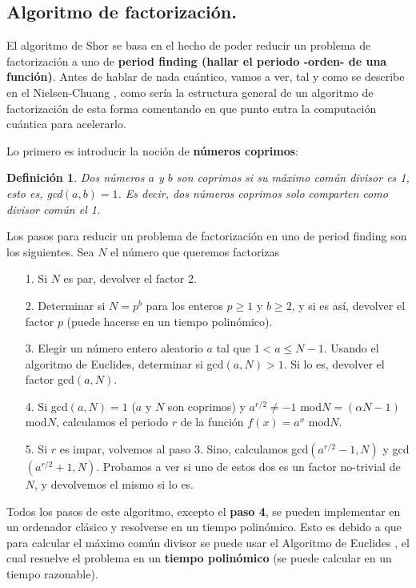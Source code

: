 \documentclass[a4paper,11pt]{book} %
\newtheorem{definicion_contador}{Definición}
\newcommand{\Definicion}[1]{
		\begin{mybox_gray2}{}
			\begin{definicion_contador}
				 #1 
			\end{definicion_contador} 
		\end{mybox_gray2}
	}
\numberwithin{equation}{chapter}
\begin{document}
\subsection{Algoritmo de factorización.} \label{sec_algoritmo_factorizacion}

El algoritmo de Shor se basa en el hecho de poder reducir un problema de factorización a uno de \textbf{period finding (hallar el periodo -orden- de una función)}. Antes de hablar de nada cuántico, vamos a ver, tal y como se describe en el Nielsen-Chuang \cite{bib_nielsen},  como sería la estructura general de un algoritmo de factorización de esta forma comentando en que punto entra la computación cuántica para acelerarlo.

Lo primero es introducir la noción de \textbf{números coprimos}:

	\Definicion{
	Dos números $a$ y $b$ son coprimos si su máximo común divisor es 1, esto es, gcd$(a,b) = 1$. Es decir, dos números coprimos solo comparten como divisor común el 1.
	}

Los pasos para reducir un problema de factorización en uno de period finding son los siguientes. Sea $N$ el número que queremos factorizas

\begin{itemize}
	\item[1.] Si $N$ es par, devolver el factor 2.

	\item[2.] Determinar si $N=p^b$ para los enteros $p \geq 1$ y $b \geq 2$, y si es así, devolver el factor $p$ (puede hacerse en un tiempo polinómico).

	\item[3.] Elegir un número entero aleatorio $a$ tal que $1 < a \leq N-1$. Usando el algoritmo de Euclides, determinar si gcd$(a,N) > 1$. Si lo es, devolver el factor gcd$(a,N)$.

	\item[4.] Si gcd$(a,N) = 1$ ($a$ y $N$ son coprimos) y $a^{r/2} \neq -1$ mod$N = (\alpha N -1)$ mod$N$, calculamos el periodo $r$ de la función $f(x) = a^x \text{ mod} N$.

	\item[5.] Si $r$ es impar, volvemos al paso 3. Sino, calculamos gcd$(a^{r/2}-1,N)$ y gcd$(a^{r/2}+1,N)$. Probamos a ver si uno de estos dos es un factor no-trivial de $N$, y devolvemos el mismo si lo es.
	
\end{itemize}

Todos los pasos de este algoritmo, excepto el \textbf{paso 4}, se pueden implementar en un ordenador clásico y resolverse en un tiempo polinómico. Esto es debido a que para calcular el máximo común divisor se puede usar el Algoritmo de Euclides \cite{bib_Euclides}, el cual resuelve el problema en un \textbf{tiempo polinómico} (se puede calcular en un tiempo razonable).
\end{document}
